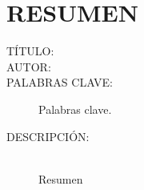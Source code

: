 \chapter*{RESUMEN}

\footnotesize{
\begin{description}
  \item[TÍTULO:] \MakeUppercase{\titulo}
  \item[AUTOR:]\MakeUppercase{\autor} 
  \item[PALABRAS CLAVE:] Palabras clave.
  \item[DESCRIPCIÓN:]\hfill \\ Resumen
\end{description}}\normalsize
